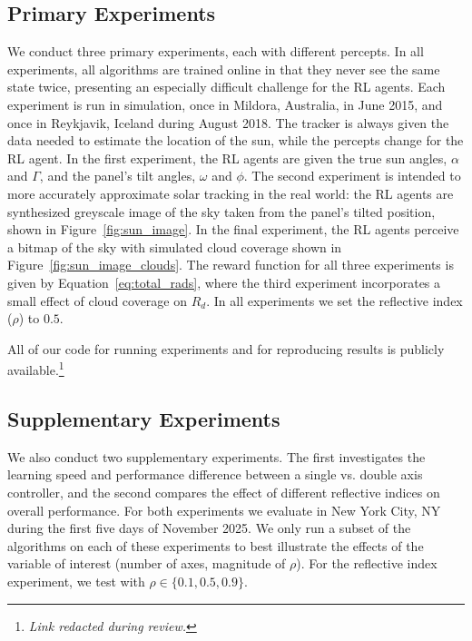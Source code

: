 \documentclass{article}
\begin{document}
{\subsection{Primary Experiments}
We conduct three primary experiments, each with different percepts. In all experiments, all algorithms are trained online in that they never see the same state twice, presenting an especially difficult challenge for the RL agents. Each experiment is run in simulation, once in Mildora, Australia, in June 2015, and once in Reykjavik, Iceland during August 2018. The tracker is always given the data needed to estimate the location of the sun, while the percepts change for the RL agent. In the first experiment, the RL agents are given the true sun angles, $\alpha$ and $\Gamma$, and the panel's tilt angles, $\omega$ and $\phi$. The second experiment is intended to more accurately approximate solar tracking in the real world: the RL agents are synthesized greyscale image of the sky taken from the panel's tilted position, shown in Figure~\ref{fig:sun_image}. In the final experiment, the RL agents perceive a bitmap of the sky with simulated cloud coverage shown in Figure~\ref{fig:sun_image_clouds}. The reward function for all three experiments is given by Equation~\ref{eq:total_rads}, where the third experiment incorporates a small effect of cloud coverage on $R_d$. In all experiments we set the reflective index ($\rho$) to $0.5$.

All of our code for running experiments and for reproducing results is publicly available.\footnote{{\it Link redacted during review.}} %

\subsection{Supplementary Experiments}
We also conduct two supplementary experiments. The first investigates the learning speed and performance difference between a single vs. double axis controller, and the second compares the effect of different reflective indices on overall performance. For both experiments we evaluate in New York City, NY during the first five days of November 2025. We only run a subset of the algorithms on each of these experiments to best illustrate the effects of the variable of interest (number of axes, magnitude of $\rho$). For the reflective index experiment, we test with $\rho \in \{0.1,0.5,0.9\}$.

}
\end{document}
